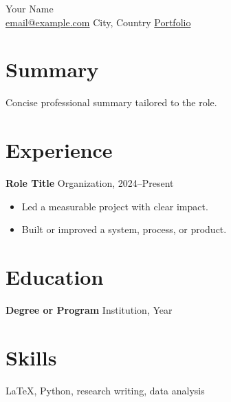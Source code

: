 \documentclass[10pt]{article}
\begin{document}
\begin{center}
  {\LARGE Your Name}\\
  \href{mailto:email@example.com}{email@example.com} \quad
  City, Country \quad
  \href{https://example.com}{Portfolio}
\end{center}

\section*{Summary}
Concise professional summary tailored to the role.

\section*{Experience}
\textbf{Role Title} \hfill Organization, 2024--Present
\begin{itemize}
  \item Led a measurable project with clear impact.
  \item Built or improved a system, process, or product.
\end{itemize}

\section*{Education}
\textbf{Degree or Program} \hfill Institution, Year

\section*{Skills}
LaTeX, Python, research writing, data analysis
\end{document}
